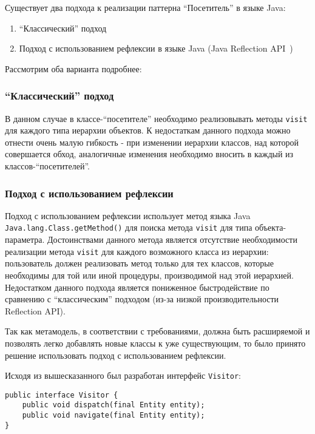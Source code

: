 Существует два подхода к реализации паттерна ``Посетитель'' в языке
Java:

\begin{enumerate}
    \item ``Классический'' подход
    \item Подход с использованием рефлексии в языке Java (Java Reflection
    API~\cite{Gosling2013})
\end{enumerate}

Рассмотрим оба варианта подробнее:

\subsubsection{``Классический'' подход}

В данном случае в классе-``посетителе'' необходимо реализовывать методы
\texttt{visit} для каждого типа иерархии объектов. К недостаткам данного подхода
можно отнести очень малую гибкость - при изменении иерархии классов, над
которой совершается обход, аналогичные изменения необходимо вносить в каждый
из классов-``посетителей''.

\subsubsection{Подход с использованием рефлексии}

Подход с использованием рефлексии использует метод языка Java
\texttt{Java.lang.Class.getMethod()} для поиска метода \texttt{visit} для
типа объекта-параметра. Достоинствами данного метода является отсутствие
необходимости реализации метода \texttt{visit} для каждого возможного класса из
иерархии: пользователь должен реализовать метод только для тех классов, которые
необходимы для той или иной процедуры, производимой над этой иерархией.
Недостатком данного подхода является пониженное быстродействие по сравнению с
``классическим'' подходом (из-за низкой производительности Reflection API).

Так как метамодель, в соответствии с требованиями, должна быть расширяемой и
позволять легко добавлять новые классы к уже существующим, то было принято
решение использовать подход с использованием рефлексии.

Исходя из вышесказанного был разработан интерфейс \texttt{Visitor}:

\begin{lstlisting}[caption={Базовый класс для обхода метамодели}]
public interface Visitor {
    public void dispatch(final Entity entity);
    public void navigate(final Entity entity);
}
\end{lstlisting}

